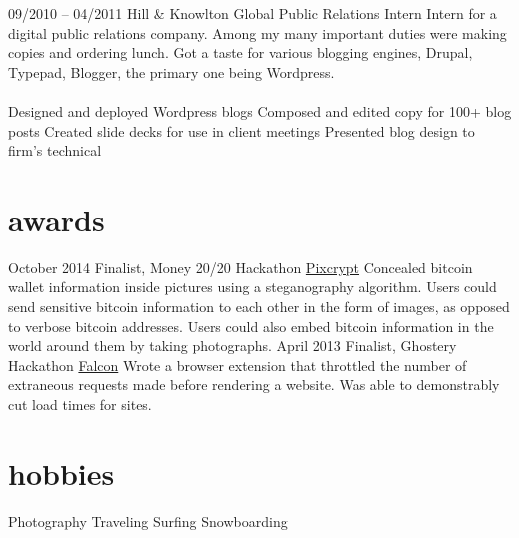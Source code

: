 \documentclass[]{friggeri-cv}
\begin{document}
\tabentry
  {09/2010 – 04/2011}
  {Hill \& Knowlton Global Public Relations}
  {Intern}
  {Intern for a digital public relations company. Among my many important duties were making copies and ordering lunch. Got a taste for various blogging engines, Drupal, Typepad, Blogger, the primary one being Wordpress.\\%
  \\%
    \bulletlist
    {Designed and deployed Wordpress blogs}
    {Composed and edited copy for 100+ blog posts}
    {Created slide decks for use in client meetings}
    {Presented blog design to firm's technical }
  }

\section{awards}

\begin{entrylist}
  \entry
    {October 2014}
    {Finalist, Money 20/20 Hackathon}
    {\href{http://github.com/dopatraman/pixcrypt}{Pixcrypt}}
    {Concealed bitcoin wallet information inside pictures using a steganography algorithm. Users could send sensitive bitcoin information to each other in the form of images, as opposed to verbose bitcoin addresses. Users could also embed bitcoin information in the world around them by taking photographs.}
  \entry
    {April 2013}
    {Finalist, Ghostery Hackathon}
    {\href{http://github.com/dopatraman/FalconExtension}{Falcon}}
    {Wrote a browser extension that throttled the number of extraneous requests made before rendering a website. Was able to demonstrably cut load times for sites.}
\end{entrylist}

\section{hobbies}

\bulletlist
  {Photography}
  {Traveling}
  {Surfing}
  {Snowboarding}
\end{document}
